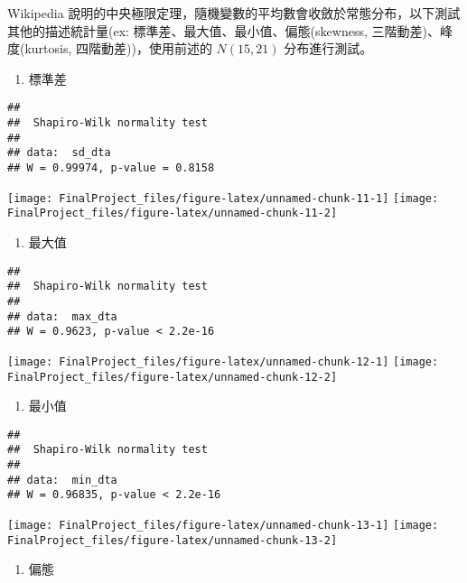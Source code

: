 \documentclass[]{article}
\providecommand{\tightlist}{%
  \setlength{\itemsep}{0pt}\setlength{\parskip}{0pt}}
\begin{document}
Wikipedia
說明的中央極限定理，隨機變數的平均數會收斂於常態分布，以下測試其他的描述統計量(ex:
標準差、最大值、最小值、偏態(skewness, 三階動差)、峰度(kurtosis,
四階動差))，使用前述的 \(N(15, 21)\) 分布進行測試。

\begin{enumerate}
\def\labelenumi{\arabic{enumi}.}
\tightlist
\item
  標準差
\end{enumerate}

\begin{verbatim}
## 
##  Shapiro-Wilk normality test
## 
## data:  sd_dta
## W = 0.99974, p-value = 0.8158
\end{verbatim}

\texttt{[image: FinalProject\_files/figure-latex/unnamed-chunk-11-1]}
\texttt{[image: FinalProject\_files/figure-latex/unnamed-chunk-11-2]}

\begin{enumerate}
\def\labelenumi{\arabic{enumi}.}
\setcounter{enumi}{1}
\tightlist
\item
  最大值
\end{enumerate}

\begin{verbatim}
## 
##  Shapiro-Wilk normality test
## 
## data:  max_dta
## W = 0.9623, p-value < 2.2e-16
\end{verbatim}

\texttt{[image: FinalProject\_files/figure-latex/unnamed-chunk-12-1]}
\texttt{[image: FinalProject\_files/figure-latex/unnamed-chunk-12-2]}

\begin{enumerate}
\def\labelenumi{\arabic{enumi}.}
\setcounter{enumi}{2}
\tightlist
\item
  最小值
\end{enumerate}

\begin{verbatim}
## 
##  Shapiro-Wilk normality test
## 
## data:  min_dta
## W = 0.96835, p-value < 2.2e-16
\end{verbatim}

\texttt{[image: FinalProject\_files/figure-latex/unnamed-chunk-13-1]}
\texttt{[image: FinalProject\_files/figure-latex/unnamed-chunk-13-2]}

\begin{enumerate}
\def\labelenumi{\arabic{enumi}.}
\setcounter{enumi}{3}
\tightlist
\item
  偏態
\end{enumerate}
\end{document}
